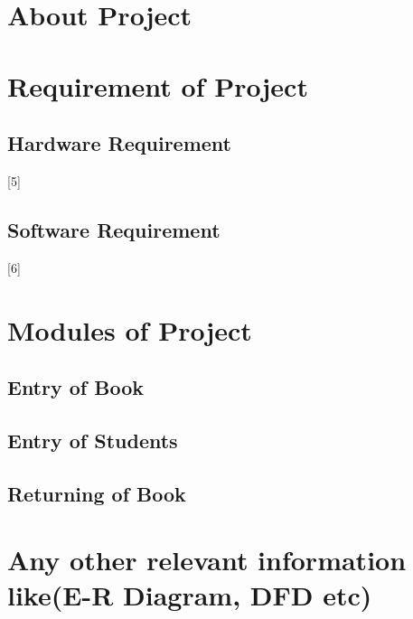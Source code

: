 \documentclass{article}
\begin{document}
\newpage
{}

\tableofcontents
\newpage

\newpage
\section{About Project}

\blindtext[1]

\newpage
\section{Requirement of Project}

\blindtext[2]

\subsection{Hardware Requirement}

[5]

\subsection{Software Requirement}

[6]

\newpage
\section{Modules of Project}

\subsection{Entry of Book}

\blindtext[3]

\subsection{Entry of Students}

\blindtext[4]

\subsection{Returning of Book}

\blindtext[5]

\newpage
\section{Any other relevant information like(E-R Diagram, DFD etc)}
\end{document}
